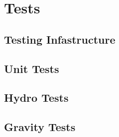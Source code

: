 
\section{Tests}


\subsection{Testing Infastructure}


\subsection{Unit Tests}


\subsection{Hydro Tests}


\subsection{Gravity Tests}
